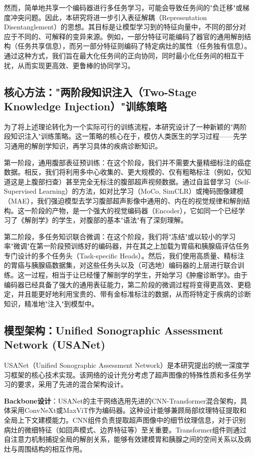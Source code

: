然而，简单地共享一个编码器进行多任务学习，可能会导致任务间的"负迁移"或梯度冲突问题。因此，本研究将进一步引入表征解耦（Representation Disentanglement）的思想。其目标是让模型学习到的特征向量中，不同的部分对应于不同的、可解释的变异来源。例如，一部分特征可能编码了器官的通用解剖结构（任务共享信息），而另一部分特征则编码了特定病灶的属性（任务独有信息）。通过这种方式，我们旨在最大化任务间的正向协同，同时最小化任务间的相互干扰，从而实现更高效、更鲁棒的协同学习。

\subsection{核心方法："两阶段知识注入（Two-Stage Knowledge Injection）"训练策略}

为了将上述理论转化为一个实际可行的训练流程，本研究设计了一种新颖的"两阶段知识注入"训练策略。这一策略的核心在于，模仿人类医生的学习过程——先学习通用的解剖学知识，再学习具体的疾病诊断知识。

第一阶段，通用腹部表征预训练：在这个阶段，我们并不需要大量精细标注的癌症数据。相反，我们将利用多中心收集的、更大规模的、仅有粗略标注（例如，仅知道这是上腹部扫查）甚至完全无标注的腹部超声视频数据。通过自监督学习（Self-Supervised Learning）的方法，如对比学习（MoCo, SimCLR）或掩码图像建模（MAE），我们强迫模型去学习腹部超声影像中通用的、内在的视觉规律和解剖结构。这一阶段的产物，是一个强大的视觉编码器（Encoder），它如同一个已经学习了《解剖学》的学生，对腹部的基本"语法"有了深刻理解。

第二阶段，多任务知识联合微调：在这个阶段，我们将"冻结"或以较小的学习率"微调"在第一阶段预训练好的编码器，并在其之上加载为胃癌和胰腺癌评估任务专门设计的多个任务头（Task-specific Heads）。然后，我们使用高质量、精标注的胃癌与胰腺癌数据集，对这些任务头以及（可选地）编码器的上层进行联合训练。这一过程，相当于让已经懂了解剖学的学生，开始学习《肿瘤诊断学》。由于编码器已经具备了强大的通用表征能力，第二阶段的微调过程将变得更高效、更稳定，并且能更好地利用宝贵的、带有金标准标注的数据，从而将特定于疾病的诊断知识，精准地"注入"到模型中。

\subsection{模型架构：Unified Sonographic Assessment Network (USANet)}

USANet（Unified Sonographic Assessment Network）是本研究提出的统一深度学习框架的核心技术实现。该网络的设计充分考虑了超声图像的特殊性质和多任务学习的要求，采用了先进的混合架构设计。

\textbf{Backbone设计}：USANet的主干网络选用先进的CNN-Transformer混合架构，具体采用ConvNeXt或MaxViT作为编码器。这种设计能够兼顾局部纹理特征提取和全局上下文建模能力。CNN组件负责提取超声图像中的细节纹理信息，对于识别病灶的微细特征（如回声模式、边界特征等）至关重要。Transformer组件则通过自注意力机制捕捉全局的解剖关系，能够有效建模胃和胰腺之间的空间关系以及病灶与周围结构的相互作用。


